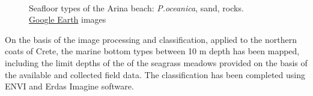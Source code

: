 \documentclass[10pt, a4paper]{article}
\begin{document}
\begin{figure}
	\centering
	\\
	\caption{Seafloor types of the Arina beach: \textit{P.oceanica}, sand, rocks. \\ \href{http://www.google.com/earth/index.html}{Google Earth} images}
	\label{fig:38}
\end{figure}

On the basis of the image processing and classification, applied to the northern coats of Crete, the
marine bottom types between 10 m depth has been mapped, including the limit depths of the of the
seagrass meadows provided on the basis of the available and collected field data. The classification
has been completed using ENVI and Erdas Imagine software.
\end{document}
